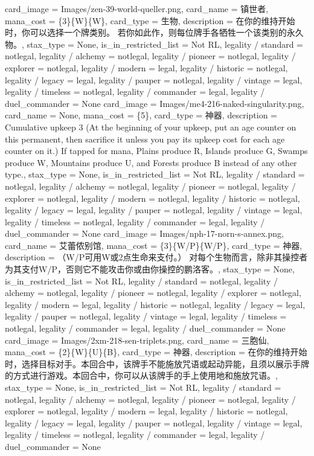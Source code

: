 \documentclass[lang = cn, color = black, 10pt]{AllThatStax}
\begin{document}
\card
{
	card_image = Images/zen-39-world-queller.png,
	card_name = 镇世者,
	mana_cost = \{3\}\{W\}\{W\},
	card_type = 生物,
	description = 在你的维持开始时，你可以选择一个牌类别。 若你如此作，则每位牌手各牺牲一个该类别的永久物。,
	stax_type = None,
	is_in_restricted_list = Not RL,
	legality / standard = notlegal,
	legality / alchemy = notlegal,
	legality / pioneer = notlegal,
	legality / explorer = notlegal,
	legality / modern = legal,
	legality / historic = notlegal,
	legality / legacy = legal,
	legality / pauper = notlegal,
	legality / vintage = legal,
	legality / timeless = notlegal,
	legality / commander = legal,
	legality / duel_commander = None
}
\card
{
	card_image = Images/me4-216-naked-singularity.png,
	card_name = None,
	mana_cost = \{5\},
	card_type = 神器,
	description = Cumulative upkeep {3} (At the beginning of your upkeep, put an age counter on this permanent, then sacrifice it unless you pay its upkeep cost for each age counter on it.)
	If tapped for mana, Plains produce {R}, Islands produce {G}, Swamps produce {W}, Mountains produce {U}, and Forests produce {B} instead of any other type.,
	stax_type = None,
	is_in_restricted_list = Not RL,
	legality / standard = notlegal,
	legality / alchemy = notlegal,
	legality / pioneer = notlegal,
	legality / explorer = notlegal,
	legality / modern = notlegal,
	legality / historic = notlegal,
	legality / legacy = legal,
	legality / pauper = notlegal,
	legality / vintage = legal,
	legality / timeless = notlegal,
	legality / commander = legal,
	legality / duel_commander = None
}
\card
{
	card_image = Images/nph-17-norn-s-annex.png,
	card_name = 艾蕾侬别馆,
	mana_cost = \{3\}\{W/P\}\{W/P\},
	card_type = 神器,
	description = （{W/P}可用{W}或2点生命来支付。）
	对每个生物而言，除非其操控者为其支付{W/P}，否则它不能攻击你或由你操控的鹏洛客。,
	stax_type = None,
	is_in_restricted_list = Not RL,
	legality / standard = notlegal,
	legality / alchemy = notlegal,
	legality / pioneer = notlegal,
	legality / explorer = notlegal,
	legality / modern = legal,
	legality / historic = notlegal,
	legality / legacy = legal,
	legality / pauper = notlegal,
	legality / vintage = legal,
	legality / timeless = notlegal,
	legality / commander = legal,
	legality / duel_commander = None
}
\card
{
	card_image = Images/2xm-218-sen-triplets.png,
	card_name = 三胞仙,
	mana_cost = \{2\}\{W\}\{U\}\{B\},
	card_type = 神器,
	description = 在你的维持开始时，选择目标对手。本回合中，该牌手不能施放咒语或起动异能，且须以展示手牌的方式进行游戏。本回合中，你可以从该牌手的手上使用地和施放咒语。,
	stax_type = None,
	is_in_restricted_list = Not RL,
	legality / standard = notlegal,
	legality / alchemy = notlegal,
	legality / pioneer = notlegal,
	legality / explorer = notlegal,
	legality / modern = legal,
	legality / historic = notlegal,
	legality / legacy = legal,
	legality / pauper = notlegal,
	legality / vintage = legal,
	legality / timeless = notlegal,
	legality / commander = legal,
	legality / duel_commander = None
}
\end{document}
